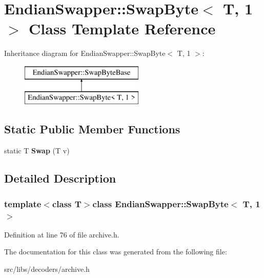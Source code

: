 \hypertarget{classEndianSwapper_1_1SwapByte_3_01T_00_011_01_4}{\section{Endian\-Swapper\-:\-:Swap\-Byte$<$ T, 1 $>$ Class Template Reference}
\label{classEndianSwapper_1_1SwapByte_3_01T_00_011_01_4}
}
Inheritance diagram for Endian\-Swapper\-:\-:Swap\-Byte$<$ T, 1 $>$\-:\begin{figure}[H]
\begin{center}
\leavevmode
\includegraphics[height=2.000000cm]{classEndianSwapper_1_1SwapByte_3_01T_00_011_01_4}
\end{center}
\end{figure}
\subsection*{Static Public Member Functions}
\begin{DoxyCompactItemize}
\item 
\hypertarget{classEndianSwapper_1_1SwapByte_3_01T_00_011_01_4_a5b58f4fae6cbf4e61854ce90c116112e}{static T {\bfseries Swap} (T v)}\label{classEndianSwapper_1_1SwapByte_3_01T_00_011_01_4_a5b58f4fae6cbf4e61854ce90c116112e}

\end{DoxyCompactItemize}


\subsection{Detailed Description}
\subsubsection*{template$<$class T$>$class Endian\-Swapper\-::\-Swap\-Byte$<$ T, 1 $>$}



Definition at line 76 of file archive.\-h.



The documentation for this class was generated from the following file\-:\begin{DoxyCompactItemize}
\item 
src/libs/decoders/archive.\-h\end{DoxyCompactItemize}
